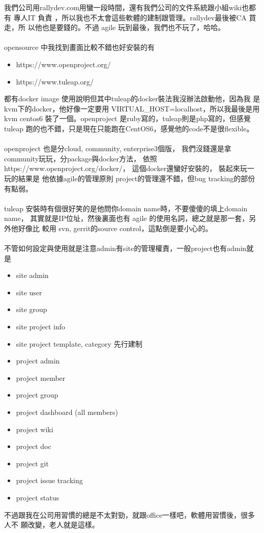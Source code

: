   我們公司用rallydev.com用蠻一段時間，還有我們公司的文件系統跟小組wiki也都有
  專人IT 負責 ，所以我也不太會這些軟體的建制跟管理。rallydev最後被CA 買走，所
  以他也是要錢的。不過 agile 玩到最後，我們也不玩了，哈哈。
  \\\\
  opensource 中我找到畫面比較不錯也好安裝的有
  \begin{itemize}
    \item https://www.openproject.org/
    \item https://www.tuleap.org/
  \end{itemize}
  都有docker image 使用說明但其中tuleap的docker裝法我沒辦法啟動他，因為我
  是kvm下的docker，他好像一定要用 VIRTUAL\_HOST=localhost，所以我最後是用
  kvm centos6 裝了一個。openproject 是ruby寫的，tuleap則是php寫的，但感覺
  tuleap 跑的也不錯，只是現在只能跑在CentOS6，感覺他的code不是很flexible。
  \\\\
  openproject 也是分cloud, community, enterprise3個版，
  我們沒錢還是拿community玩玩，分package與docker方法，
  依照https://www.openproject.org/docker/， 這個docker還蠻好安裝的，
  裝起來玩一玩的結果是 他依據agile的管理原則
  project的管理還不錯，但bug tracking的部份有點弱。
  \\\\
  tuleap 安裝時有個很好笑的是他問你domain name時，不要傻傻的填上domain name，
  其實就是IP位址，然後裏面也有 agile 的使用名詞，總之就是那一套，另外他好像比
  較用 svn, gerrit的source control，這點倒是要小心的。
  \\\\
  不管如何設定與使用就是注意admin有site的管理權責，一般project也有admin就是
  \begin{itemize}
    \item site admin
    \item site user
    \item site group
    \item site project info
    \item site project template, category 先行建制
    \item project admin
    \item project member
    \item project group
    \item project dashboard (all members)
    \item project wiki
    \item project doc
    \item project git
    \item project issue tracking
    \item project status
  \end{itemize}
  不過跟我在公司用習慣的總是不太對勁，就跟office一樣吧，軟體用習慣後，很多人不
  願改變，老人就是這樣。

